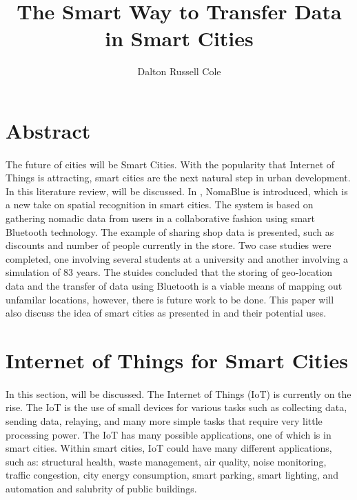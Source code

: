 \documentclass[a4paper,12pt]{article}
\title{The Smart Way to Transfer Data in Smart Cities}
\author{Dalton Russell Cole}
\begin{document}
\clearpage\maketitle
\thispagestyle{empty}
\newpage
\clearpage
\setcounter{page}{1}


\section*{Abstract}
\paragraph{}
The future of cities will be Smart Cities. With the popularity that Internet of Things is attracting, smart cities are the next natural step in urban development. In this literature review, \cite{SC} will be discussed. In \cite{SC}, NomaBlue is introduced, which is a new take on spatial recognition in smart cities. The system is based on gathering nomadic data from users in a collaborative fashion using smart Bluetooth technology. The example of sharing shop data is presented, such as discounts and number of people currently in the store. Two case studies were completed, one involving several students at a university and another involving a simulation of 83 years. The stuides concluded that the storing of geo-location data and the transfer of data using Bluetooth is a viable means of mapping out unfamilar locations, however, there is future work to be done. This paper will also discuss the idea of smart cities as presented in \cite{IOT} and their potential uses.

\section*{Internet of Things for Smart Cities}
\paragraph{}
In this section, \cite{IOT} will be discussed. The Internet of Things (IoT) is currently on the rise. The IoT is the use of small devices for various tasks such as collecting data, sending data, relaying, and many more simple tasks that require very little processing power. The IoT has many possible applications, one of which is in smart cities. Within smart cities, IoT could have many different applications, such as: structural health, waste management, air quality, noise monitoring, traffic congestion, city energy consumption, smart parking, smart lighting, and automation and salubrity of public buildings.
\end{document}
